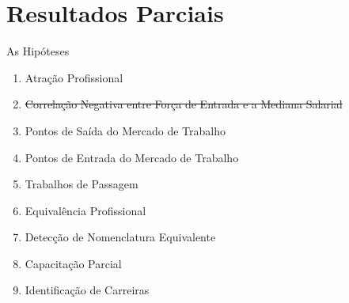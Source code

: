 \documentclass[10pt, hyperref={pdfpagelabels=false}]{beamer}
\begin{document}
\section{Resultados Parciais}

\begin{frame}[label=hipoteses]{As Hipóteses}
  \begin{enumerate}
    \item Atração Profissional
    \item \sout{Correlação Negativa entre Força de Entrada e a Mediana Salarial}
    \item Pontos de Saída do Mercado de Trabalho
    \item Pontos de Entrada do Mercado de Trabalho
    \item Trabalhos de Passagem 
    \item Equivalência Profissional 
    \item Detecção de Nomenclatura Equivalente 
    \item Capacitação Parcial
    \item Identificação de Carreiras
  \end{enumerate}
\end{frame}
\end{document}
